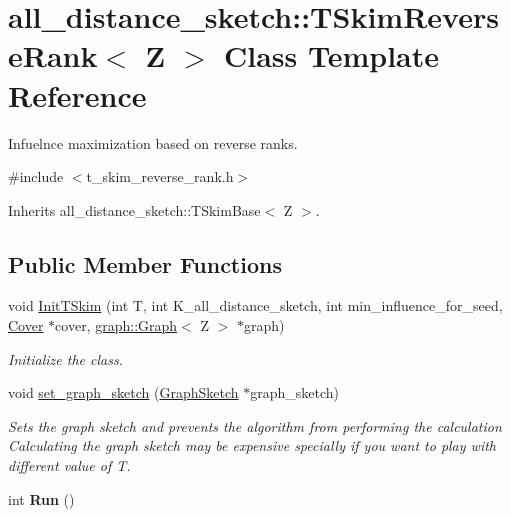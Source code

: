 \hypertarget{classall__distance__sketch_1_1TSkimReverseRank}{}\section{all\+\_\+distance\+\_\+sketch\+:\+:T\+Skim\+Reverse\+Rank$<$ Z $>$ Class Template Reference}
\label{classall__distance__sketch_1_1TSkimReverseRank}


Infuelnce maximization based on reverse ranks.  




{\ttfamily \#include $<$t\+\_\+skim\+\_\+reverse\+\_\+rank.\+h$>$}



Inherits all\+\_\+distance\+\_\+sketch\+::\+T\+Skim\+Base$<$ Z $>$.

\subsection*{Public Member Functions}
\begin{DoxyCompactItemize}
\item 
void \hyperlink{classall__distance__sketch_1_1TSkimReverseRank_ad1c20be2016c93f41094fb93afc8068a}{Init\+T\+Skim} (int T, int K\+\_\+all\+\_\+distance\+\_\+sketch, int min\+\_\+influence\+\_\+for\+\_\+seed, \hyperlink{classall__distance__sketch_1_1Cover}{Cover} $\ast$cover, \hyperlink{classall__distance__sketch_1_1graph_1_1Graph}{graph\+::\+Graph}$<$ Z $>$ $\ast$graph)
\begin{DoxyCompactList}\small\item\em Initialize the class. \end{DoxyCompactList}\item 
\hypertarget{classall__distance__sketch_1_1TSkimReverseRank_a37732f433766b29970827029921c343d}{}void \hyperlink{classall__distance__sketch_1_1TSkimReverseRank_a37732f433766b29970827029921c343d}{set\+\_\+graph\+\_\+sketch} (\hyperlink{classall__distance__sketch_1_1GraphSketch}{Graph\+Sketch} $\ast$graph\+\_\+sketch)\label{classall__distance__sketch_1_1TSkimReverseRank_a37732f433766b29970827029921c343d}

\begin{DoxyCompactList}\small\item\em Sets the graph sketch and prevents the algorithm from performing the calculation Calculating the graph sketch may be expensive specially if you want to play with different value of T. \end{DoxyCompactList}\item 
\hypertarget{classall__distance__sketch_1_1TSkimReverseRank_a22ae4f64b2703b599fc56397141ac138}{}int {\bfseries Run} ()\label{classall__distance__sketch_1_1TSkimReverseRank_a22ae4f64b2703b599fc56397141ac138}

\end{DoxyCompactItemize}


